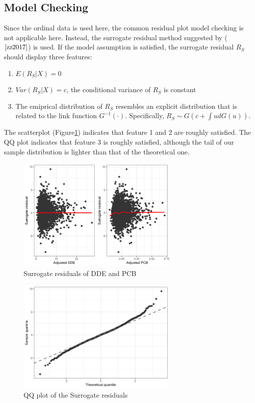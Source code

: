 \documentclass[wcp]{jmlr}%
\begin{document}
\subsection{Model Checking}
Since the ordinal data is used here, the common residual plot model checking is not applicable here. Instead, the surrogate residual method suggested by ($\ref{zz2017}$) is used. If the model assumption is satisfied, the surrogate residual $R_S$ should display three features: 

\begin{enumerate}
	\item $E(R_S|X)=0$
	\item $Var(R_S|X)=c$, the conditional variance of $R_S$ is constant
	\item The emiprical distribution of $R_S$ resembles an explicit distribution that is related to the link function $G^{-1}(\cdot)$. Specifically, $R_S\sim G(c+\int ud G(u))$.
\end{enumerate}

The scatterplot (Figure\ref{fig:surrogateresid}) indicates that feature 1 and 2 are roughly satisfied. The QQ plot indicates that feature 3 is roughly satisfied, although the tail of our sample distribution is lighter than that of the theoretical one. 

\begin{figure}
	\centering
	\includegraphics[width=0.7\textwidth]{Surrogate_residuals.png}
	\caption{Surrogate residuals of DDE and PCB}
	\label{fig:surrogateresid}
\end{figure}

\begin{figure}
	\centering
	\includegraphics[width=0.7\textwidth]{qqplot.png}
	\caption{QQ plot of the Surrogate residuals}
	\label{fig:qqplot}
\end{figure}
\end{document}
